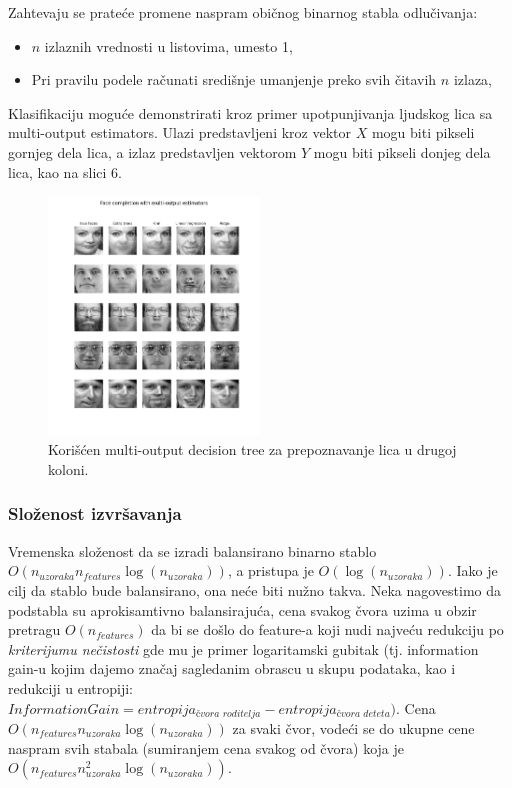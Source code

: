 \documentclass[fontsize=12bp, paper=a4]{scrarticle}
\begin{document}
Zahtevaju se prateće promene naspram običnog binarnog stabla odlučivanja:
\begin{itemize}
    \item $n$ izlaznih vrednosti u listovima, umesto 1,
    \item Pri pravilu podele računati središnje umanjenje preko svih čitavih $n$ izlaza,
\end{itemize}

Klasifikaciju moguće demonstrirati kroz primer upotpunjivanja ljudskog lica sa multi-output estimators. Ulazi predstavljeni kroz vektor $X$ mogu biti pikseli gornjeg dela lica, a izlaz predstavljen vektorom $Y$ mogu biti pikseli donjeg dela lica, kao na slici 6.
\begin{figure}[h!]
    \centering
    \includegraphics[width=0.5\textwidth]{image-4.png}
    \caption{Korišćen multi-output decision tree za prepoznavanje lica u drugoj koloni.}
\end{figure}

\subsubsection{Složenost izvršavanja}
Vremenska složenost da se izradi balansirano binarno stablo $O(n_{uzoraka}n_{features}\log(n_{uzoraka}))$, a pristupa je $O(\log(n_{uzoraka}))$.
Iako je cilj da stablo bude balansirano, ona neće biti nužno takva. Neka nagovestimo da podstabla su aprokisamtivno balansirajuća, cena svakog čvora uzima u obzir pretragu $O(n_{features})$ da bi se došlo do feature-a koji nudi najveću redukciju po \textit{kriterijumu nečistosti} gde mu je primer logaritamski gubitak (tj. information gain-u kojim dajemo značaj sagledanim obrascu u skupu podataka, kao i redukciji u entropiji: $Information Gain = entropija_\textit{čvora roditelja}-entropija_\textit{čvora deteta})$.\cite{entropy}
Cena $O(n_{features}n_{uzoraka}\log(n_{uzoraka}))$ za svaki čvor, vodeći se do ukupne cene naspram svih stabala (sumiranjem cena svakog od čvora) koja je $O(n_{features}n_{uzoraka}^{2}\log(n_{uzoraka}))$.
\end{document}
